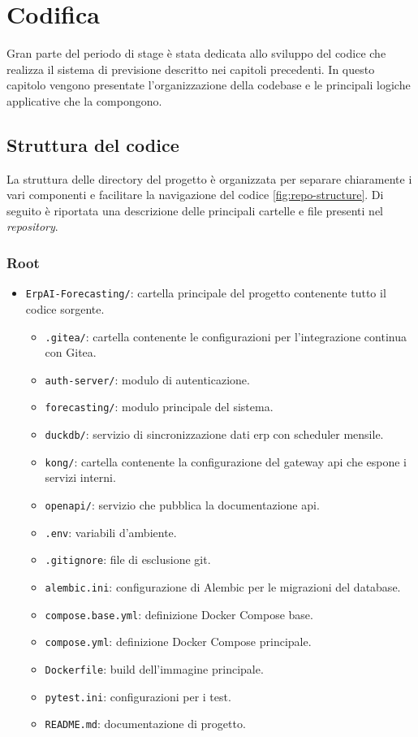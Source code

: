 \chapter{Codifica}
\label{chap:code}
Gran parte del periodo di stage è stata dedicata allo sviluppo del codice che realizza il sistema di previsione descritto nei capitoli precedenti.
In questo capitolo vengono presentate l’organizzazione della codebase e le principali logiche applicative che la compongono.

\section{Struttura del codice}
\label{chap:codebase}
La struttura delle directory del progetto è organizzata per separare chiaramente i vari componenti e facilitare la navigazione del codice \ref{fig:repo-structure}.
Di seguito è riportata una descrizione delle principali cartelle e file presenti nel \textit{repository}.
\subsection{Root}
\begin{itemize}
    \item \texttt{ErpAI-Forecasting/}: cartella principale del progetto contenente tutto il codice sorgente.
    \begin{itemize}
        \item \texttt{.gitea/}: cartella contenente le configurazioni per l’integrazione continua con Gitea.
        \item \texttt{auth-server/}: modulo di autenticazione.
        \item \texttt{forecasting/}: modulo principale del sistema.
        \item \texttt{duckdb/}: servizio di sincronizzazione dati \gls{erp} con scheduler mensile.
        \item \texttt{kong/}: cartella contenente la configurazione del gateway \acrshort{api} che espone i servizi interni.
        \item \texttt{openapi/}: servizio che pubblica la documentazione \acrshort{api}.
        \item \texttt{.env}: variabili d’ambiente.
        \item \texttt{.gitignore}: file di esclusione git.
        \item \texttt{alembic.ini}: configurazione di Alembic per le migrazioni del database.
        \item \texttt{compose.base.yml}: definizione Docker Compose base.
        \item \texttt{compose.yml}: definizione Docker Compose principale.
        \item \texttt{Dockerfile}: build dell’immagine principale.
        \item \texttt{pytest.ini}: configurazioni per i test.
        \item \texttt{README.md}: documentazione di progetto.
    \end{itemize}
\end{itemize}
